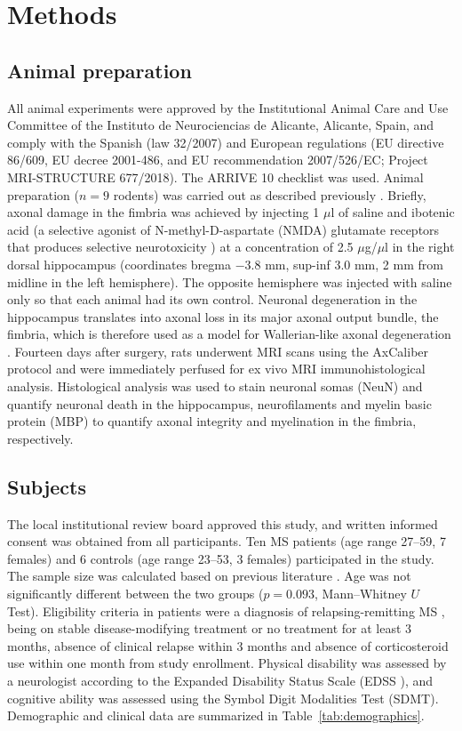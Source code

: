 \documentclass[11pt]{article}
\begin{document}
\section{Methods}

\subsection{Animal preparation}
All animal experiments were approved by the Institutional Animal Care and Use Committee of the Instituto de Neurociencias de Alicante, Alicante, Spain, and comply with the Spanish (law 32/2007) and European regulations (EU directive 86/609, EU decree 2001-486, and EU recommendation 2007/526/EC; Project MRI-STRUCTURE 677/2018). The ARRIVE 10 checklist was used. Animal preparation ($n=9$ rodents) was carried out as described previously \cite{GarciaHernandez2022}. Briefly, axonal damage in the fimbria was achieved by injecting 1 $\mu$l of saline and ibotenic acid (a selective agonist of N-methyl-D-aspartate (NMDA) glutamate receptors that produces selective neurotoxicity \cite{Zinkand1992}) at a concentration of 2.5 $\mu$g/$\mu$l in the right dorsal hippocampus (coordinates bregma $-3.8$ mm, sup-inf 3.0 mm, 2 mm from midline in the left hemisphere). The opposite hemisphere was injected with saline only so that each animal had its own control. Neuronal degeneration in the hippocampus translates into axonal loss in its major axonal output bundle, the fimbria, which is therefore used as a model for Wallerian-like axonal degeneration \cite{Conforti2014}. Fourteen days after surgery, rats underwent MRI scans using the AxCaliber protocol and were immediately perfused for ex vivo MRI immunohistological analysis. Histological analysis was used to stain neuronal somas (NeuN) and quantify neuronal death in the hippocampus, neurofilaments and myelin basic protein (MBP) to quantify axonal integrity and myelination in the fimbria, respectively.

\subsection{Subjects}
The local institutional review board approved this study, and written informed consent was obtained from all participants. Ten MS patients (age range 27--59, 7 females) and 6 controls (age range 23--53, 3 females) participated in the study. The sample size was calculated based on previous literature \cite{Huang2016}. Age was not significantly different between the two groups ($p=0.093$, Mann--Whitney $U$ Test). Eligibility criteria in patients were a diagnosis of relapsing-remitting MS \cite{Polman2011}, being on stable disease-modifying treatment or no treatment for at least 3 months, absence of clinical relapse within 3 months and absence of corticosteroid use within one month from study enrollment. Physical disability was assessed by a neurologist according to the Expanded Disability Status Scale (EDSS \cite{Kurtzke1983}), and cognitive ability was assessed using the Symbol Digit Modalities Test (SDMT). Demographic and clinical data are summarized in Table~\ref{tab:demographics}.
\end{document}
